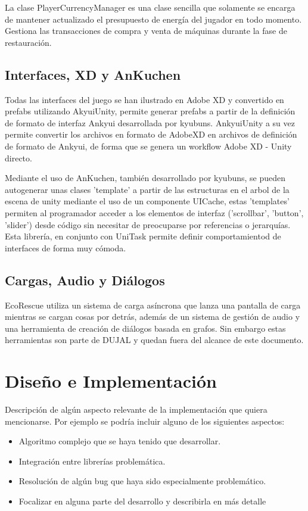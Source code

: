 La clase PlayerCurrencyManager es una clase sencilla que solamente se encarga de mantener actualizado el presupuesto de energía del jugador en todo momento. Gestiona las transacciones de compra y venta de máquinas durante la fase de restauración.

\subsection{Interfaces, XD y AnKuchen}

Todas las interfaces del juego se han ilustrado en Adobe XD y convertido en prefabs utilizando AkyuiUnity\cite{AkyuiUnity}, permite generar prefabs a partir de la definición de formato de interfaz Ankyui desarrollada por kyubuns. AnkyuiUnity a su vez permite convertir los archivos en formato de AdobeXD en archivos de definición de formato de Ankyui, de forma que se genera un workflow Adobe XD - Unity directo.

Mediante el uso de AnKuchen\cite{AnKuchen}, también desarrollado por kyubuns, se pueden autogenerar unas clases 'template' a partir de las estructuras en el arbol de la escena de unity mediante el uso de un componente UICache, estas 'templates' permiten al programador acceder a los elementos de interfaz ('scrollbar', 'button', 'slider') desde código sin necesitar de preocuparse por referencias o jerarquías. Esta librería, en conjunto con UniTask\cite{UniTask} permite definir comportamientod de interfaces de forma muy cómoda.

\subsection{Cargas, Audio y Diálogos}

EcoRescue utiliza un sistema de carga asíncrona que lanza una pantalla de carga mientras se cargan cosas por detrás, además de un sistema de gestión de audio y una herramienta de creación de diálogos basada en grafos. Sin embargo estas herramientas son parte de DUJAL\cite{DUJAL} y quedan fuera del alcance de este documento. 

\section{Diseño e Implementación} 

Descripción de algún aspecto relevante de la implementación que quiera mencionarse. Por ejemplo se podría incluir alguno de los siguientes aspectos:
\begin{itemize}
    \item Algoritmo complejo que se haya tenido que desarrollar.
    \item Integración entre librerías problemática.
    \item Resolución de algún bug que haya sido especialmente problemático.
    \item Focalizar en alguna parte del desarrollo y describirla en más detalle
\end{itemize}


